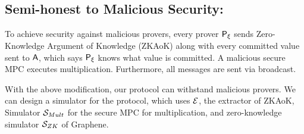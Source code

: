\subsection{Semi-honest to Malicious Security: }\label{sec:semi-honesttomalicious} 
To achieve security against malicious provers, every prover $\mathsf{P}_\xi$ sends Zero-Knowledge Argument of Knowledge (ZKAoK) along with every committed value sent to $\mathsf{A}$, which says $\mathsf{P}_\xi$ knows what value is committed. A malicious secure MPC executes multiplication. Furthermore, all messages are sent via broadcast.

With the above modification, our protocol can withstand malicious provers. We can design a simulator for the protocol, which uses $\mathcal{E}$, the extractor of ZKAoK, Simulator $\mathcal{S}_{Mult}$ for the secure MPC for multiplication, and zero-knowledge simulator $\mathcal{S}_{ZK}$ of Graphene. 

